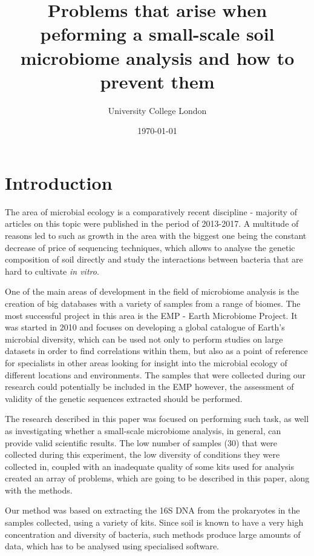 \documentclass[12pt,twocolumn]{article} %
\title{Problems that arise when peforming a small-scale soil microbiome analysis and how to prevent them}
\author{\normalsize University College London \\}
\date{\today}
\begin{document}
	
\maketitle
%
%

\section{Introduction}
The area of microbial ecology is a comparatively recent discipline -  majority of articles on this topic were published in the period of 2013-2017. A multitude of reasons led to such as growth in the area with the biggest one being the constant decrease of price of sequencing techniques, which allows to analyse the genetic composition of soil directly and study the interactions between bacteria that are hard to cultivate \textit{in vitro}.
\par
One of the main areas of development in the field of microbiome analysis is the creation of big databases with a variety of samples from a range of biomes. The most successful project in this area is the EMP - Earth Microbiome Project\cite{Gilbert2014}. It was started in 2010 and focuses on developing a global catalogue of Earth's microbial diversity, which can be used not only to perform studies on large datasets in order to find correlations within them, but also as a point of reference for specialists in other areas looking for insight into the microbial ecology of different locations and environments. The samples that were collected during our research could potentially be included in the EMP however, the assessment of validity of the genetic sequences extracted should be performed.
\par
The research described in this paper was focused on performing such task, as well as investigating whether a small-scale microbiome analysis, in general, can provide valid scientific results. The low number of samples (30) that were collected during this experiment, the low diversity of conditions they were collected in, coupled with an inadequate quality of some kits used for analysis created an array of problems, which are going to be described in this paper, along with the methods.
\par
Our method was based on extracting the 16S DNA from the prokaryotes in the samples collected, using a variety of kits. Since soil is known to have a very high concentration and diversity of bacteria\cite{Nannipieri2003,Torsvik1996}, such methods produce large amounts of data, which has to be analysed using specialised software.
%
\end{document}
